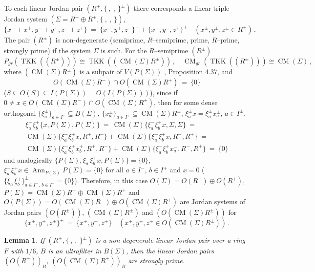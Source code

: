 \documentclass[a4paper,11pt]{article}
\newtheorem{lemma}[defi]{Lemma}
\DeclareMathOperator{\CM}{CM}
\DeclareMathOperator{\Ann}{Ann}
\DeclareMathOperator{\TKK}{TKK}
\begin{document}
To each linear Jordan pair ${(R^{\pm}, \{\ ,\ ,\ \}^{\pm})}$ there corresponds 
a linear triple Jordan system ${(\Sigma=R^{-}\oplus R^{+}, \{\ ,\ ,\ \})}$,
\[
\{x^{-}+x^{+}, y^{-}+y^{+}, z^{-}+z^{+}\}\ =\ 
\{x^{-}, y^{+}, z^{-}\}^{-}+\{x^{+}, y^{-}, z^{+}\}^{+}\quad 
(x^{\pm}, y^{\pm}, z^{\pm}\in R^{\pm})\,.
\]
The pair ${(R^{\pm})}$ is non-degenerate (semiprime, $R$--semiprime, prime, 
$R$--prime, strongly prime) if the system $\Sigma$ is such. For the 
$R$--semiprime $(R^{\pm})$  
\[
P_{gr}(\TKK((R^{\pm})))\cong \TKK((\CM(\Sigma) R^{\pm}))\,,\quad 
\CM_{gr}(\TKK((R^{\pm})))\cong \CM(\Sigma)\,,
\]
where ${(\CM(\Sigma) R^{\pm})}$ is a subpair of $V(P(\Sigma))$ 
\cite{Gol6}, Proposition 4.37, and  
\[
O(\CM(\Sigma) R^{-})\cap O(\CM(\Sigma) R^{+})\ =\ \{0\}
\]
(${S\subseteq O(S)\subseteq I(P(\Sigma))=O(I(P(\Sigma)))}$), since if 
${0\ne x\in O(\CM(\Sigma) R^{-})\cap O(\CM(\Sigma) R^{+})}$, then for 
some dense orthogonal ${\{\xi^{\pm}_a\}_{a\in I^{\pm}}\subseteq B(\Sigma)}$, 
${\{x^{\pm}_a\}_{a\in I^{\pm}}\subseteq \CM(\Sigma) R^{\pm}}$, 
${\xi^{\pm}_a x=\xi^{\pm}_a x^{\pm}_a}$, ${a\in I^{\pm}}$, 
\begin{multline*}
\xi^{-}_a \xi^{+}_b \{x, P(\Sigma), P(\Sigma)\}\ =\ 
\CM(\Sigma) \{\xi^{-}_a \xi^{+}_b x, \Sigma, \Sigma\}\ =
\\ 
\CM(\Sigma) \{\xi^{-}_a \xi^{+}_b x, R^{+}, R^{-}\}+
\CM(\Sigma) \{\xi^{-}_a \xi^{+}_b x, R^{-}, R^{+}\}\ =
\\ 
\CM(\Sigma) \{\xi^{-}_a \xi^{+}_b x^{+}_b, R^{+}, R^{-}\}+
\CM(\Sigma) \{\xi^{-}_a \xi^{+}_b x^{-}_a, R^{-}, R^{+}\}\ =\
\{0\}
\end{multline*} 
and analogically ${\{P(\Sigma), \xi^{-}_a \xi^{+}_b x, P(\Sigma)\}=\{0\}}$, 
${\xi^{-}_a \xi^{+}_b x\in \Ann_{P(\Sigma)} P(\Sigma)=\{0\}}$ for all 
${a\in I^{-}}$, ${b\in I^{+}}$ and ${x=0}$ 
(${\{\xi^{-}_a \xi^{+}_b\}_{a\in I^{-},\ b\in I^{+}}^{\perp}=\{0\}}$). 
Therefore, in this case ${O(\Sigma)=O(R^{-})\oplus O(R^{+})}$, 
${P(\Sigma)=\CM(\Sigma) R^{-}\oplus \CM(\Sigma) R^{+}}$ and  
${O(P(\Sigma))=O(\CM(\Sigma) R^{-})\oplus O(\CM(\Sigma) R^{+})}$ are 
Jordan systems of Jordan pairs 
$(O(R^{\pm}))$, $(\CM(\Sigma) R^{\pm})$ and $(O(\CM(\Sigma) R^{\pm}))$ for  
\[
\{x^{\pm}, y^{\mp}, z^{\pm}\}^{\pm}\ =\ \{x^{\pm}, y^{\mp}, z^{\pm}\}\quad 
(x^{\pm}, y^{\pm}, z^{\pm}\in O(\CM(\Sigma) R^{\pm}))\,.
\]

\begin{lemma}
If ${(R^{\pm}, \{\ ,\ ,\ \}^{\pm})}$ is a non-degenerate linear Jordan pair 
over a ring $F$ with $1/6$, $B$ is an ultrafilter in $B(\Sigma)$, then 
the linear Jordan pairs $(O(R^{\pm}))_B$, $(O(\CM(\Sigma) R^{\pm}))_B$ are 
strongly prime. 
\end{lemma}
\end{document}
